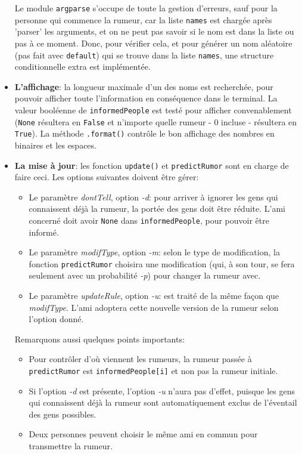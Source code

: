 \documentclass[11pt,a4paper]{article}
\begin{document}
\begin{itemize}
  Le module \texttt{argparse} s'occupe de toute la gestion d'erreurs, sauf pour la
  personne qui commence la rumeur, car la liste \texttt{names} est chargée après
  'parser' les arguments, et on ne peut pas savoir si le nom est dans la liste ou
  pas à ce moment. Donc, pour vérifier cela, et pour générer un nom aléatoire (pas fait avec \texttt{default}) qui se trouve dans la liste \texttt{names}, une structure conditionnelle extra est implémentée.


\item \textbf{L'affichage}: la longueur maximale d'un des noms est recherchée, pour pouvoir afficher toute l'information en conséquence dans le terminal. La valeur booléenne de \texttt{informedPeople} est testé pour afficher convenablement (\texttt{None} résultera en \texttt{False} et n'importe quelle rumeur - 0 incluse - résultera en \texttt{True}). La méthode \texttt{.format()} contrôle le bon affichage des nombres en binaires et les espaces.

\item \textbf{La mise à jour}: les fonction \texttt{update()} et \texttt{predictRumor} sont en charge de faire ceci. Les options suivantes doivent être gérer:
\begin{itemize}
\item Le paramètre \emph{dontTell}, option \emph{-d}: pour arriver à ignorer les gens qui connaissent déjà la rumeur, la portée des gens doit être réduite. L'ami concerné doit avoir \texttt{None} dans \texttt{informedPeople}, pour pouvoir être informé.
\item Le paramètre \emph{modifType}, option \emph{-m}: selon le type de modification, la fonction \texttt{predictRumor} choisira une modification (qui, à son tour, se fera seulement avec un probabilité \emph{-p}) pour changer la rumeur avec.
\item Le paramètre \emph{updateRule}, option \emph{-u}: est traité de la même façon que \emph{modifType}. L'ami adoptera cette nouvelle version de la rumeur selon l'option donné.
\end{itemize}

Remarquons aussi quelques points importants:

\begin{itemize}
\item Pour contrôler d'où viennent les rumeurs, la rumeur passée à \texttt{predictRumor} est \texttt{informedPeople[i]} et non pas la rumeur initiale.
\item Si l'option \emph{-d} est présente, l'option \emph{-u} n'aura pas d'effet, puisque les gens qui connaissent déjà la rumeur sont automatiquement exclus de l'éventail des gens possibles.
\item Deux personnes peuvent choisir le même ami en commun pour transmettre la rumeur.
\end{itemize}

\end{itemize}
\end{document}
